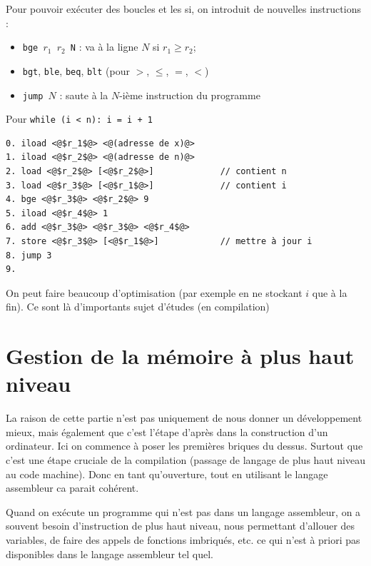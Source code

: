 \begin{rem}
	Pour pouvoir exécuter des boucles et les si, on introduit de nouvelles instructions : \begin{itemize}[label=$\bullet$]
		\item \texttt{bge $r_1$ $r_2$ N} : va à la ligne $N$ si $r_1 \geq r_2$;
		\item \texttt{bgt}, \texttt{ble}, \texttt{beq}, \texttt{blt} (pour $>$, $\leq$, $=$, $<$)
		\item \texttt{jump $N$} : saute à la $N$-ième instruction du programme
	\end{itemize}
\end{rem}

\begin{example}
	Pour \texttt{while (i < n): i = i + 1}
	\begin{lstlisting}
0. iload <@$r_1$@> <@(adresse de x)@>
1. iload <@$r_2$@> <@(adresse de n)@>
2. load <@$r_2$@> [<@$r_2$@>]             // contient n
3. load <@$r_3$@> [<@$r_1$@>]             // contient i
4. bge <@$r_3$@> <@$r_2$@> 9
5. iload <@$r_4$@> 1
6. add <@$r_3$@> <@$r_3$@> <@$r_4$@>
7. store <@$r_3$@> [<@$r_1$@>]            // mettre à jour i
8. jump 3
9.
	\end{lstlisting}
\end{example}

\begin{rem}
	On peut faire beaucoup d'optimisation (par exemple en ne stockant $i$ que à la fin). Ce sont là d'importants sujet d'études (en compilation)
\end{rem}

\section{Gestion de la mémoire à plus haut niveau}

\begin{com}
	La raison de cette partie n'est pas uniquement de nous donner un développement mieux, mais également que c'est l'étape d'après dans la construction d'un ordinateur. Ici on commence à poser les premières briques du dessus. Surtout que c'est une étape cruciale de la compilation (passage de langage de plus haut niveau au code machine). Donc en tant qu'ouverture, tout en utilisant le langage assembleur ca parait cohérent.
\end{com}

Quand on exécute un programme qui n'est pas dans un langage assembleur, on a souvent besoin d’instruction de plus haut niveau, nous permettant d'allouer des variables, de faire des appels de fonctions imbriqués, etc. ce qui n'est à priori pas disponibles dans le langage assembleur tel quel.\\

